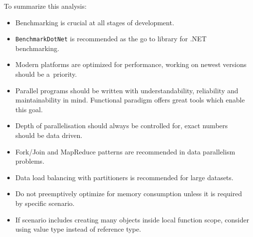To summarize this analysis: 
\begin{itemize}
	\item Benchmarking is crucial at all stages of development.
	\item \texttt{BenchmarkDotNet} is recommended as the go to library for .NET benchmarking.
	\item Modern platforms are optimized for performance, working on newest versions should be a~priority.
	\item Parallel programs should be written with understandability, reliability and maintainability in mind. Functional paradigm offers great tools which enable this goal.
	\item Depth of parallelisation should always be controlled for, exact numbers should be data driven.
	\item Fork/Join and MapReduce patterns are recommended in data parallelism problems. 
	\item Data load balancing with partitioners is recommended for large datasets.
	\item Do not preemptively optimize for memory consumption unless it is required by specific scenario.
	\item If scenario includes creating many objects inside local function scope, consider using value type instead of reference type.

\end{itemize}
